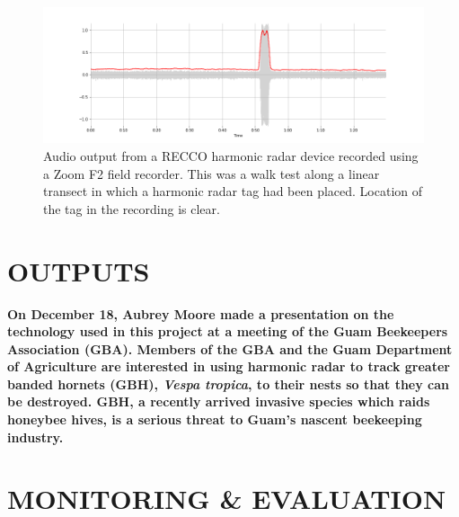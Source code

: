\documentclass[12pt,letterpaper,english,bibliography=totocnumbered,abstract=on]{scrartcl}
\begin{document}
\begin{figure}[h]
	\centering
	\includegraphics[width=\linewidth]{211109_003.png}
	\caption{Audio output from a RECCO harmonic radar device recorded using a Zoom F2 field recorder. This was a walk test along a linear transect in which a harmonic radar tag had been placed. Location of the tag in the recording is clear.}
	\label{fig:211109003}
\end{figure}

\clearpage

\section{OUTPUTS} 

%
%
%
%
%
%

\textbf{On December 18, Aubrey Moore made a presentation on the technology used in this project at a meeting of the Guam Beekeepers Association (GBA). Members of the GBA and the Guam Department of Agriculture are interested in using harmonic radar to track greater banded hornets (GBH), \textit{Vespa tropica}, to their nests so that they can be destroyed. GBH, a recently arrived invasive species which raids honeybee hives, is a serious threat to Guam's nascent beekeeping industry.
}
\section{MONITORING \& EVALUATION}

%
\end{document}
